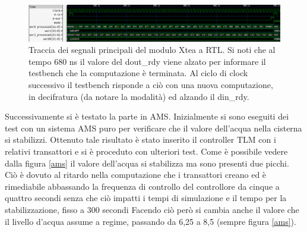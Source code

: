 \documentclass[]{IEEEtran}
\begin{document}
\begin{figure}[htb]
	\centering
	\includegraphics[width=\textwidth]{Images/wave1.png}
	\caption{Traccia dei segnali principali del modulo Xtea a RTL. Si noti che al tempo 680 ns il valore del dout\_rdy viene alzato per informare il testbench che la computazione è terminata. Al ciclo di clock successivo il testbench risponde a ciò con una nuova computazione, in decifratura (da notare la modalità) ed alzando il din\_rdy.}
	\label{wave1}
\end{figure}
Successivamente si è testato la parte in AMS. Inizialmente si sono eseguiti dei test con un sistema AMS puro per verificare che il valore dell'acqua nella cisterna si stabilizzi. Ottenuto tale risultato è stato inserito il controller TLM con i relativi transattori e si è proceduto con ulteriori test. Come è possibile vedere dalla figura \ref{ams} il valore dell'acqua si stabilizza ma sono presenti due picchi. Ciò è dovuto al ritardo nella computazione che i transattori creano ed è rimediabile abbassando la frequenza di controllo del controllore da cinque a quattro secondi senza che ciò impatti i tempi di simulazione %
e il tempo per la stabilizzazione, fisso a 300 secondi
Facendo ciò però si cambia anche il valore che il livello d'acqua assume a regime, passando da 6,25 a 8,5 (sempre figura \ref{ams}).
\end{document}
